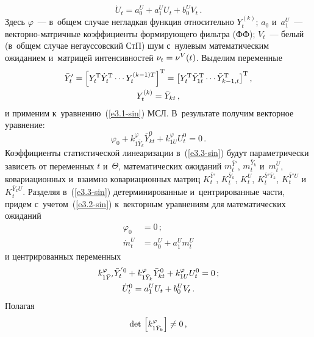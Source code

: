 \begin{multicols}{2}
     \vspace*{-3pt}
     
     \noindent
\begin{equation}
    \dot U_t = a_0^U + a_1^U U_t + b_0^U V_t\,.\label{e3.2-sin}
    \end{equation}
Здесь $\varphi$~---  в~общем случае негладкая функция относительно  $Y_t^{(k)}$; 
$a_0$ и~$a_1^U$~--- век\-тор\-но-мат\-рич\-ные коэффициенты формирующего фильтра (ФФ); 
$V_t$~--- белый (в~общем случае негауссовский СтП) шум с~нулевым математическим 
ожиданием и~матрицей интенсивностей $\nu_t \hm= \nu^V(t)$. Выделим переменные
    \begin{multline*}
    \bar Y_t' =\left[ Y_t^{\mathrm{T}}\dot{Y}_t^{\mathrm{T}}\cdots 
    Y_t^{(k-1)T}\right]^{\mathrm{T}}= 
    \left[ Y_t^{\mathrm{T}} \bar Y_{1t}^{\mathrm{T}} \cdots 
    \bar Y_{k-1,t}^{\mathrm{T}} \right]^{\mathrm{T}},\\ 
    Y_t^{(k)} = \bar Y_{kt}\,,
   \end{multline*}
и применим к~уравнению~(\ref{e3.1-sin}) МСЛ. В~результате получим векторное уравнение:
    \begin{equation}
    \varphi_0 + k_{1\bar Y_k}^\varphi \bar Y_{kt}^0 + 
    k_{1U}^\varphi U_t^0=0\,.\label{e3.3-sin}
    \end{equation}
Коэффициенты статистической линеаризации в~(\ref{e3.3-sin}) 
будут параметрически зависеть от переменных $t$ и~$\Theta$, математических 
ожиданий $m_t^{\bar Y'}$, $m_t^{\bar Y_k}$ и~$m_t^U$, ковариационных и~взаимно 
ковариационных матриц $K_t^{\bar Y'}$, $K_t^{\bar Y_k}$, $K_t^U$, $K_t^{\bar Y'\bar Y_k}$, 
$K_t^{\bar Y'U}$ и~$K_t^{\bar Y_kU}$.
Разделяя в~(\ref{e3.3-sin}) детерминированные и~центрированные части, придем 
с~учетом~(\ref{e3.2-sin}) к~векторным уравнениям для математических ожиданий
    \begin{align}
    \varphi_0 &=0\,;\label{e3.4-sin}\\
    \dot m_t^U &= a_0^U+ a_1^U m_t^U\label{e3.5-sin}
    \end{align}
и центрированных переменных
    \begin{gather}
    k_{1\bar Y'}^\varphi \bar Y_t^{'0} + k_{1\bar Y_k}^\varphi 
    \bar Y_{kt}^0 + k_{1U}^\varphi U_t^0 =0\,;\label{e3.6-sin}\\
\dot U_t^0 = a_1^U U_t + b_0^U V_t\,.\notag %
\end{gather}
Полагая
    \begin{equation}
    \mathrm{det}\, \lk k_{1\bar Y_k}^\varphi\rk\ne 0\,,\label{e3.8-sin}

\end{equation}
\end{multicols}
